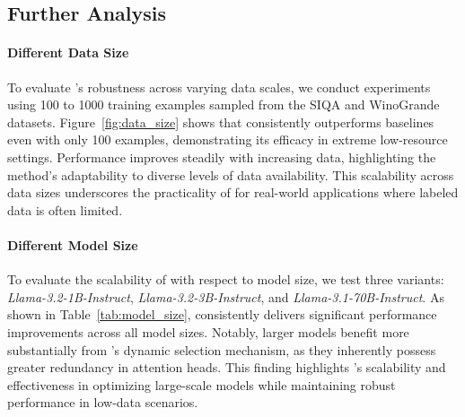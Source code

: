 

\subsection{Further Analysis}
\label{subsec:data_model_size}
\paragraph{Different Data Size}
To evaluate \jola{}'s robustness across varying data scales, we conduct experiments using 100 to 1000 training examples sampled from the SIQA and WinoGrande datasets.
Figure~\ref{fig:data_size} shows that \jola{} consistently outperforms baselines even with only 100 examples, demonstrating its efficacy in extreme low-resource settings.
Performance improves steadily with increasing data, highlighting the method's adaptability to diverse levels of data availability.
This scalability across data sizes underscores the practicality of \jola{} for real-world applications where labeled data is often limited.



\paragraph{Different Model Size}
To evaluate the scalability of \jola{} with respect to model size, we test three variants: \textit{Llama-3.2-1B-Instruct}, \textit{Llama-3.2-3B-Instruct}, and \textit{Llama-3.1-70B-Instruct}.
As shown in Table~\ref{tab:model_size}, \jola{} consistently delivers significant performance improvements across all model sizes.
Notably, larger models benefit more substantially from \jola{}'s dynamic selection mechanism, as they inherently possess greater redundancy in attention heads.
This finding highlights \jola{}'s scalability and effectiveness in optimizing large-scale models while maintaining robust performance in low-data scenarios.



